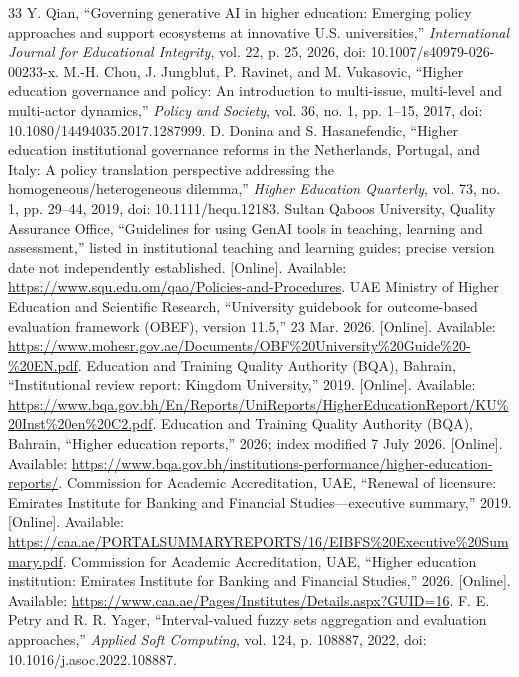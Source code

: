 \documentclass[conference,letterpaper]{IEEEtran}
\begin{document}
\begin{thebibliography}{33}
 Y. Qian, ``Governing generative AI in higher education: Emerging policy approaches and support ecosystems at innovative U.S. universities,'' \emph{International Journal for Educational Integrity}, vol. 22, p. 25, 2026, doi: 10.1007/s40979-026-00233-x.
 M.-H. Chou, J. Jungblut, P. Ravinet, and M. Vukasovic, ``Higher education governance and policy: An introduction to multi-issue, multi-level and multi-actor dynamics,'' \emph{Policy and Society}, vol. 36, no. 1, pp. 1--15, 2017, doi: 10.1080/14494035.2017.1287999.
 D. Donina and S. Hasanefendic, ``Higher education institutional governance reforms in the Netherlands, Portugal, and Italy: A policy translation perspective addressing the homogeneous/heterogeneous dilemma,'' \emph{Higher Education Quarterly}, vol. 73, no. 1, pp. 29--44, 2019, doi: 10.1111/hequ.12183.
 Sultan Qaboos University, Quality Assurance Office, ``Guidelines for using GenAI tools in teaching, learning and assessment,'' listed in institutional teaching and learning guides; precise version date not independently established. [Online]. Available: \url{https://www.squ.edu.om/qao/Policies-and-Procedures}.
 UAE Ministry of Higher Education and Scientific Research, ``University guidebook for outcome-based evaluation framework (OBEF), version 11.5,'' 23 Mar. 2026. [Online]. Available: \url{https://www.mohesr.gov.ae/Documents/OBF%20University%20Guide%20-%20EN.pdf}.
 Education and Training Quality Authority (BQA), Bahrain, ``Institutional review report: Kingdom University,'' 2019. [Online]. Available: \url{https://www.bqa.gov.bh/En/Reports/UniReports/HigherEducationReport/KU%20Inst%20en%20C2.pdf}.
 Education and Training Quality Authority (BQA), Bahrain, ``Higher education reports,'' 2026; index modified 7 July 2026. [Online]. Available: \url{https://www.bqa.gov.bh/institutions-performance/higher-education-reports/}.
 Commission for Academic Accreditation, UAE, ``Renewal of licensure: Emirates Institute for Banking and Financial Studies---executive summary,'' 2019. [Online]. Available: \url{https://caa.ae/PORTALSUMMARYREPORTS/16/EIBFS%20Executive%20Summary.pdf}.
 Commission for Academic Accreditation, UAE, ``Higher education institution: Emirates Institute for Banking and Financial Studies,'' 2026. [Online]. Available: \url{https://www.caa.ae/Pages/Institutes/Details.aspx?GUID=16}.
 F. E. Petry and R. R. Yager, ``Interval-valued fuzzy sets aggregation and evaluation approaches,'' \emph{Applied Soft Computing}, vol. 124, p. 108887, 2022, doi: 10.1016/j.asoc.2022.108887.

\end{thebibliography}
\end{document}
